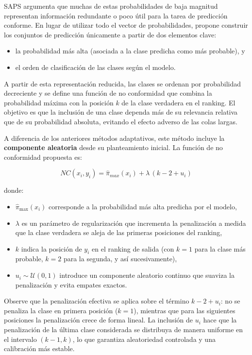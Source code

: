 \acrshort{SAPS} argumenta que muchas de estas probabilidades de baja magnitud representan información redundante o poco útil para la tarea de predicción conforme. En lugar de utilizar todo el vector de probabilidades, propone construir los conjuntos de predicción únicamente a partir de dos elementos clave: 
\begin{itemize}
    \item la probabilidad más alta (asociada a la clase predicha como más probable), y
    \item el orden de clasificación de las clases según el modelo.
\end{itemize}

A partir de esta representación reducida, las clases se ordenan por probabilidad decreciente y se define una función de no conformidad que combina la probabilidad máxima con la posición $k$ de la clase verdadera en el ranking. El objetivo es que la inclusión de una clase dependa más de su relevancia relativa que de su probabilidad absoluta, evitando el efecto adverso de las colas largas.

A diferencia de los anteriores métodos adaptativos, este método incluye la \textbf{componente aleatoria} desde su planteamiento inicial. La función de no conformidad propuesta es:

$$
NC(x_i, y_i) = \hat{\pi}_{max}(x_i) + \lambda \,(k - 2 + u_i)
$$

donde:  
\begin{itemize}
    \item $\hat{\pi}_{\max}(x_i)$ corresponde a la probabilidad más alta predicha por el modelo,  
    \item $\lambda$ es un parámetro de regularización que incrementa la penalización a medida que la clase verdadera se aleja de las primeras posiciones del ranking,  
    \item $k$ indica la posición de $y_i$ en el ranking de salida (con $k=1$ para la clase más probable, $k=2$ para la segunda, y así sucesivamente),  
    \item $u_i \sim \mathcal{U}(0,1)$ introduce un componente aleatorio continuo que suaviza la penalización y evita empates exactos.
\end{itemize}

Observe que la penalización efectiva se aplica sobre el término $k - 2 + u_i$: no se penaliza la clase en primera posición ($k=1$), mientras que para las siguientes posiciones la penalización crece de forma lineal. La inclusión de $u_i$ hace que la penalización de la última clase considerada se distribuya de manera uniforme en el intervalo $(k-1, k)$, lo que garantiza aleatoriedad controlada y una calibración más estable.

